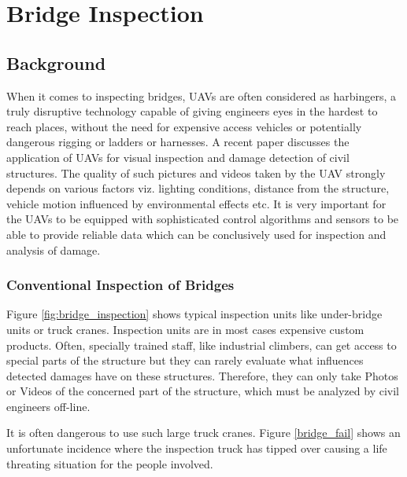\documentclass[12pt]{report}
\begin{document}
\chapter{Bridge Inspection}
\label{bridge_chapter}
\section{Background}
When it comes to inspecting bridges, UAVs are often considered as harbingers, a truly disruptive technology capable of giving engineers eyes in the hardest to reach places, without the need for expensive access vehicles or potentially dangerous rigging or ladders or harnesses. A recent paper  \cite{morgenthal2014quality} discusses the application of UAVs for visual inspection and damage detection of civil structures. The quality of such pictures and videos taken by the UAV strongly depends on various factors viz. lighting conditions, distance from the structure, vehicle motion influenced by environmental effects etc. It is very important for the UAVs to be equipped with sophisticated control algorithms and sensors to be able to provide reliable data which can be conclusively used for inspection and analysis of damage.

\subsection{Conventional Inspection of Bridges}
Figure \ref{fig:bridge_inspection} shows typical inspection units like under-bridge units or truck cranes. Inspection units are in most cases expensive custom products. Often, specially trained staff, like industrial climbers, can get access to special parts of the structure but they can rarely evaluate what influences detected damages have on these structures. Therefore, they can only take Photos or Videos of the concerned part of the structure, which must be analyzed by civil engineers off-line.\par It is often dangerous to use such large truck cranes. Figure \ref{bridge_fail} shows an unfortunate incidence where the inspection truck has tipped over causing a life threating situation for the people involved.\par
 
\end{document}
